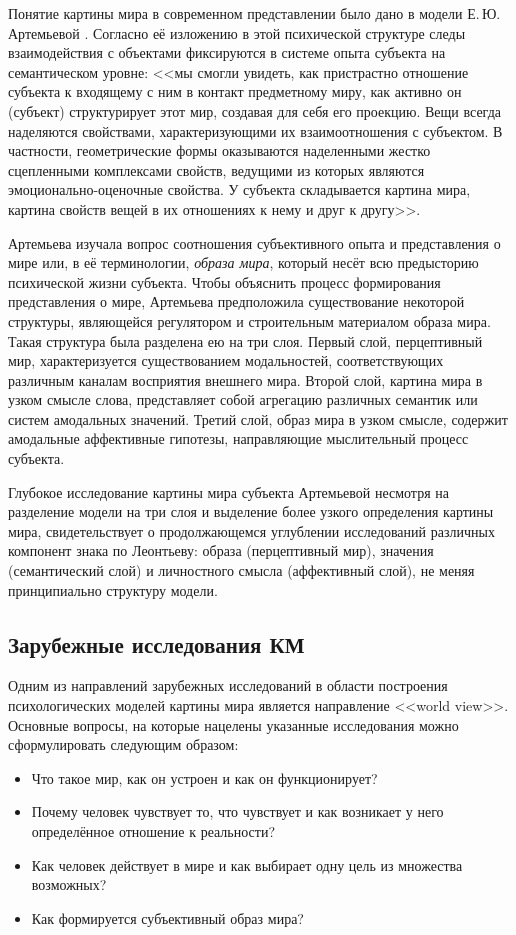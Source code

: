 Понятие картины мира в современном представлении было дано в модели Е.\,Ю. Артемьевой \cite{Artemyeva1980}. Согласно её изложению в этой психической структуре следы взаимодействия с объектами фиксируются в системе опыта субъекта на семантическом уровне: <<мы смогли увидеть, как пристрастно отношение субъекта к входящему с ним в контакт предметному миру, как активно он (субъект) структурирует этот мир, создавая для себя его проекцию. Вещи всегда наделяются свойствами, характеризующими их взаимоотношения с субъектом. В частности, геометрические формы оказываются наделенными жестко сцепленными комплексами свойств, ведущими из которых являются эмоционально-оценочные свойства. У субъекта складывается картина мира, картина свойств вещей в их отношениях к нему и друг к другу>>. 

Артемьева изучала вопрос соотношения субъективного опыта и представления о мире или, в её терминологии, \textit{образа мира}, который несёт всю предысторию психической жизни субъекта. Чтобы объяснить процесс формирования представления о мире, Артемьева предположила существование некоторой структуры, являющейся регулятором и строительным материалом образа мира. Такая структура была разделена ею на три слоя. Первый слой, перцептивный мир, характеризуется существованием модальностей, соответствующих различным каналам восприятия внешнего мира. Второй слой, картина мира в узком смысле слова, представляет собой агрегацию различных семантик или систем амодальных значений. Третий слой, образ мира в узком смысле, содержит амодальные аффективные гипотезы, направляющие мыслительный процесс субъекта.

Глубокое исследование картины мира субъекта Артемьевой несмотря на разделение модели на три слоя и выделение более узкого определения картины мира, свидетельствует о продолжающемся углублении исследований различных компонент знака по Леонтьеву: образа (перцептивный мир), значения (семантический слой) и личностного смысла (аффективный слой), не меняя принципиально структуру модели.

\subsection{Зарубежные исследования КМ}

Одним из направлений зарубежных исследований в области построения психологических моделей картины мира является направление <<world view>>. Основные вопросы, на которые нацелены указанные исследования можно сформулировать следующим образом: 
\begin{itemize}
	\item Что такое мир, как он устроен и как он функционирует? 
	\item Почему человек чувствует то, что чувствует и как возникает у него определённое отношение к реальности? 
	\item Как человек действует в мире и как выбирает одну цель из множества возможных? 
	\item Как формируется субъективный образ мира?
\end{itemize}
 
